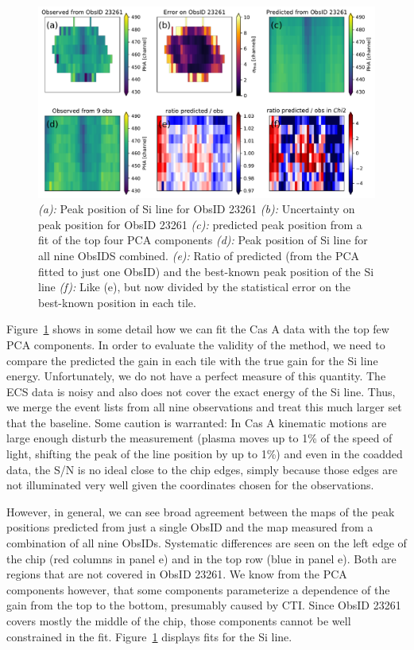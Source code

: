 \documentclass[]{spie}  %
\begin{document}
\begin{figure} [ht]
  \begin{center}
    \includegraphics[width=\textwidth]{figures/Si_23261.pdf}
  \end{center}
  \caption
      {\emph{(a):} Peak position of Si line for ObsID 23261 \emph{(b):} Uncertainty on peak position for ObsID 23261 \emph{(c):} predicted peak position from a fit of the top four PCA components \emph{(d):} Peak position of Si line for all nine ObsIDS combined. \emph{(e):} Ratio of predicted (from the PCA fitted to just one ObsID) and the best-known peak position of the Si line \emph{(f):} Like (e), but now divided by the statistical error on the best-known position in each tile.        \label{fig:Si23261}}
\end{figure}

Figure~\ref{fig:Si23261} shows in some detail how we can fit the Cas A data with the top few PCA components. In order to evaluate the validity of the method, we need to compare the predicted the gain in each tile with the true gain for the Si line energy. Unfortunately, we do not have a perfect measure of this quantity. The ECS data is noisy and also does not cover the exact energy of the Si line. Thus, we merge the event lists from all nine observations and treat this much larger set that the baseline. Some caution is warranted: In Cas A kinematic motions are large enough disturb the measurement (plasma moves up to 1\% of the speed of light, shifting the peak of the line position by up to 1\%) and even in the coadded data, the S/N is no ideal close to the chip edges, simply because those edges are not illuminated very well given the coordinates chosen for the observations.

However, in general, we can see broad agreement between the maps of the peak positions predicted from just a single ObsID and the map measured from a combination of all nine ObsIDs. Systematic differences are seen on the left edge of the chip (red columns in panel e) and in the top row (blue in panel e). Both are regions that are not covered in ObsID 23261. We know from the PCA components however, that some components parameterize a dependence of the gain from the top to the bottom, presumably caused by CTI. Since ObsID 23261 covers mostly the middle of the chip, those components cannot be well constrained in the fit. Figure~\ref{fig:Si23261} displays fits for the Si line.
\end{document}
